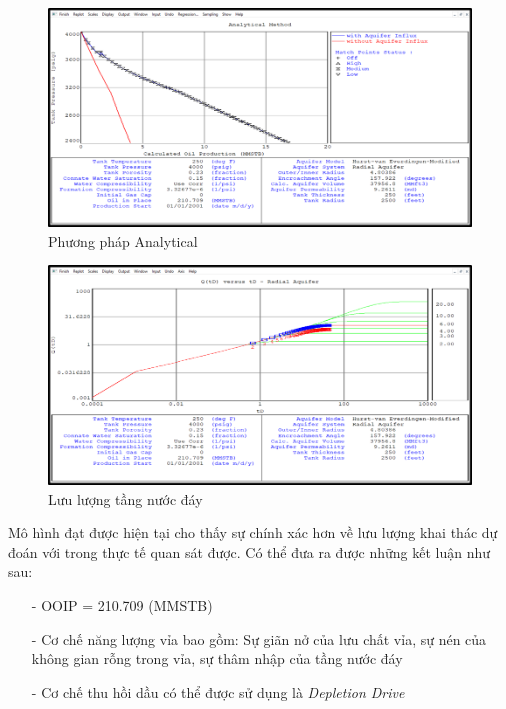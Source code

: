 \documentclass[12pt,a4paper]{report}
\begin{document}
        \begin{figure}[h]
        	\centering
            \includegraphics[scale=0.6]{Fig/ana_fixed.png}
            \caption{Phương pháp Analytical}
            \label{fig:ana_fixed}
        \end{figure}
        \begin{figure}[h]
        	\centering
            \includegraphics[scale=0.6]{Fig/wd_fixed.png}
            \caption{Lưu lượng tầng nước đáy}
            \label{fig:wd_fixed}
        \end{figure}
        \clearpage
        \noindent
Mô hình đạt được hiện tại cho thấy sự chính xác hơn về lưu lượng khai thác dự đoán với trong thực tế quan sát được. Có thể đưa ra được những kết luận như sau:
	\begin{itemize}
    	\item[-] OOIP = 210.709 (MMSTB)
        \item[-] Cơ chế năng lượng vỉa bao gồm: Sự giãn nở của lưu chất vỉa, sự nén của không gian rỗng trong vỉa, sự thâm nhập của tầng nước đáy
        \item[-] Cơ chế thu hồi dầu có thể được sử dụng là \textit{Depletion Drive}
    \end{itemize}
\end{document}
